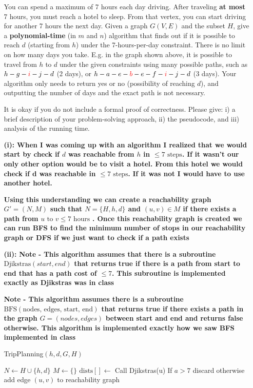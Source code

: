 \documentclass[addpoints]{exam}
\begin{document}
\begin{questions}
You can spend a maximum of 7 hours each day driving. After traveling \textbf{at most} 7 hours, you must reach a hotel to sleep. From that vertex, you can start driving for another 7 hours the next day. Given a graph $G(V,E)$ and the subset $H$, give a \textbf{polynomial-time} (in $m$ and $n$) algorithm that finds out if it is possible to reach $d$ (starting from $h$) under the 7-hours-per-day constraint. There is no limit on how many days you take. E.g. in the graph shown above, it is possible to travel from $h$ to $d$ under the given constraints using many possible paths, such as $h-g-\textcolor{red}{i}-j-d$ (2 days), or $h-a-e-\textcolor{red}{b}-e-f-\textcolor{red}{i}-j-d$ (3 days). Your algorithm only needs to return yes or no (possibility of reaching $d$), and outputting the number of days and the exact path is not necessary.

It is okay if you do not include a formal proof of correctness. Please give: i) a brief description of your problem-solving approach, ii) the pseudocode, and iii) analysis of the running time. 

\textbf{(i): When I was coming up with an algorithm I realized that we would start by check if $d$ was reachable from $h$ in $\le 7 \text{ steps}$. If it wasn't our only other option would be to visit a hotel. From this hotel we would check if d was reachable in $\le 7 \text{ steps}$. If it was not I would have to use another hotel.}

\textbf{Using this understanding we can create a reachability graph $G' = (N, M)$ such that $N = \{H,h,d\} $ and $(u,v) \in M$ if there exists a path from $u \text{ to } v \le 7 \text{ hours}$ . Once this reachability graph is created we can run BFS to find the minimum number of stops in our reachability graph or DFS if we just want to check if a path exists}

\textbf{(ii): Note - This algorithm assumes that there is a subroutine $\text{Djikstras}(start, end)$ that returns true if there is a path from start to end that has a path cost of $\le 7$. This subroutine is implemented exactly as Djikstras was in class}

\textbf{Note - This algorithm assumes there is a subroutine $\text{BFS}(\text{nodes, edges, start, end})$ that returns true if there exists a path in the graph $G=(nodes, edges)$ between start and end and returns false otherwise. This algorithm is implemented exactly how we saw BFS implemented in class}

\begin{algorithm}
\caption{TripPlanning$(h,d,G,H)$}\label{alg:cap}
\begin{algorithmic}[1]
\State $N \gets H \cup \{h,d\}$ 
\State $M \gets \{\}$  
\State $\text{dists}[] \gets$ Call Djikstras(u) 
\State If $a > 7$ discard otherwise add edge $(u, v)$ to reachability graph
\EndFor
\EndFor \\
\end{algorithmic}
\end{algorithm}


\end{questions}
\end{document}
